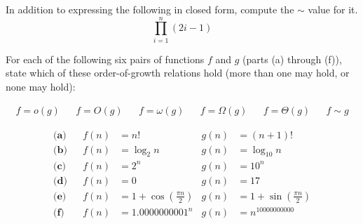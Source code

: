 \documentclass[12pt,twoside]{article}
\begin{document}
\begin{problem}
In addition to expressing the following in closed form, compute the $\sim$ value for it.
\[
\prod_{i=1}^n (2i-1)
\]

\eparts
\end{problem}

\begin{problem}{20}
For each of the following six pairs of functions $f$ and $g$ (parts (a) through (f)), state which of these order-of-growth relations hold (more than one may hold, or none may hold):

\begin{align*}
 f = o(g) && f=O(g) && f=\omega(g) && f=\Omega(g) && f=\Theta(g) && f \sim g
\end{align*}

\begin{align*}
\textbf{(a)}&& f(n) &= n!  &g(n) & = (n+1)! \\
\textbf{(b)}&& f(n) &= \log_2 n &  g(n) &= \log_{10} n \\
\textbf{(c)}&& f(n) &= 2^n & g(n) &= 10^n\\
\textbf{(d)}&& f(n) &= 0 & g(n) &= 17\\
\textbf{(e)}&& f(n) &= 1+\cos\left(\frac{\pi n}{2}\right) & g(n) &= 1+\sin\left(\frac{\pi n}{2}\right)\\
\textbf{(f)}&& f(n) &= {1.0000000001}^n & g(n) &= n^{10000000000}\\
\end{align*}

\end{problem}
\end{document}

